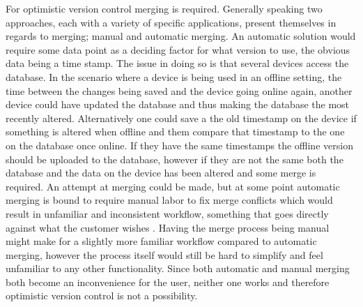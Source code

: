 For optimistic version control merging is required. 
Generally speaking two approaches, each with a variety of specific applications, present themselves in regards to merging; manual and automatic merging.
An automatic solution would require some data point as a deciding factor for what version to use, the obvious data being a time stamp.
The issue in doing so is that several devices access the database.
In the scenario where a device is being used in an offline setting, the time between the changes being saved and the device going online again, another device could have updated the database and thus making the database the most recently altered.  
Alternatively one could save a the old timestamp on the device if something is altered when offline and them compare that timestamp to the one on the database once online. 
If they have the same timestamps the offline version should be uploaded to the database, however if they are not the same both the database and the data on the device has been altered and some merge is required. 
An attempt at merging could be made, but at some point automatic merging is bound to require manual labor to fix merge conflicts which would result in unfamiliar and inconsistent workflow, something that goes directly against what the customer wishes .
Having the merge process being manual might make for a slightly more familiar workflow compared to automatic merging, however the process itself would still be hard to simplify and feel unfamiliar to any other functionality. 
Since both automatic and manual merging both become an inconvenience for the user, neither one works and therefore optimistic version control is not a possibility.
 

